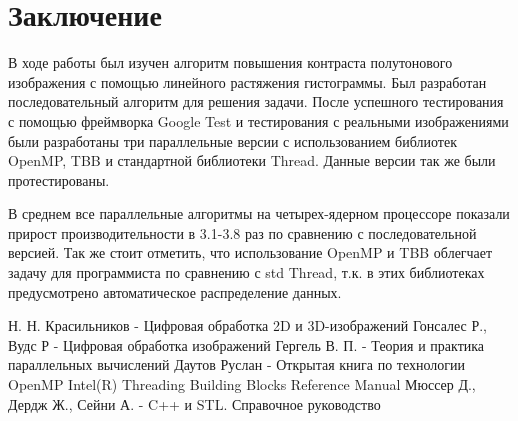 \documentclass{report}
\begin{document}
    \newpage
	\section*{Заключение}
	\par В ходе работы был изучен алгоритм повышения контраста полутонового изображения с помощью линейного растяжения гистограммы. Был разработан последовательный алгоритм для решения задачи. После успешного тестирования с помощью фреймворка Google Test и тестирования с реальными изображениями были разработаны три параллельные версии с использованием библиотек OpenMP, TBB и стандартной библиотеки Thread. Данные версии так же были протестированы.
	\par В среднем все параллельные алгоритмы на четырех-ядерном процессоре показали прирост производительности  в 3.1-3.8 раз по сравнению с последовательной версией. Так же стоит отметить, что использование OpenMP и TBB облегчает задачу для программиста по сравнению с std Thread, т.к. в этих библиотеках предусмотрено автоматическое распределение данных.
	
	\newpage
	\begin{thebibliography}{1}
		 Н. Н. Красильников - Цифровая обработка 2D и 3D-изображений
		 Гонсалес Р., Вудс Р - Цифровая обработка изображений
		 Гергель В. П. - Теория и практика параллельных вычислений
		 Даутов Руслан - Открытая книга по технологии OpenMP
		 Intel(R) Threading Building Blocks Reference Manual
		 Мюссер Д., Дердж Ж., Сейни А. - C++ и STL. Справочное руководство
	\end{thebibliography}
	
	\newpage
\end{document}
